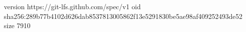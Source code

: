 version https://git-lfs.github.com/spec/v1
oid sha256:289b77b4102d626dab8537813005862f13e5291830be5ae98af409252493de52
size 7910
